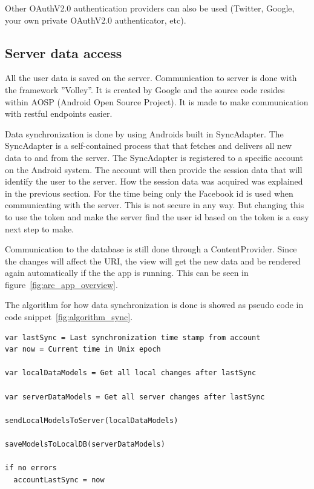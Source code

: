 Other OAuthV2.0 authentication providers can also be used (Twitter, Google, your own private OAuthV2.0 authenticator, etc). 


\subsection{Server data access}

All the user data is saved on the server. Communication to server is done with the framework ''Volley''. It is created by Google and the source code resides within AOSP (Android Open Source Project). It is made to make communication with restful endpoints easier.

Data synchronization is done by using Androids built in SyncAdapter. The SyncAdapter is a self-contained process that that fetches and delivers all new data to and from the server. The SyncAdapter is registered to a specific account on the Android system. The account will then provide the session data that will identify the user to the server. How the session data was acquired was explained in the previous section. For the time being only the Facebook id is used when communicating with the server. This is not secure in any way. But changing this to use the token and make the server find the user id based on the token is a easy next step to make.

Communication to the database is still done through a ContentProvider. Since the changes will affect the URI, the view will get the new data and be rendered again automatically if the the app is running. This can be seen in figure~\ref{fig:arc_app_overview}.

The algorithm for how data synchronization is done is showed as pseudo code in code snippet~\ref{fig:algorithm_sync}.


\noindent\begin{minipage}{\textwidth}
\begin{lstlisting}[caption={Algorithm for the synchronization flow.}, label={fig:algorithm_sync}]
var lastSync = Last synchronization time stamp from account
var now = Current time in Unix epoch

var localDataModels = Get all local changes after lastSync

var serverDataModels = Get all server changes after lastSync

sendLocalModelsToServer(localDataModels)

saveModelsToLocalDB(serverDataModels)

if no errors
  accountLastSync = now
\end{lstlisting}
\end{minipage}

